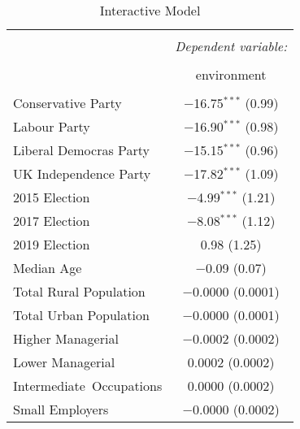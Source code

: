\documentclass[12pt,letterpaper]{article}
\renewcommand{\headrulewidth}{0pt} %
\begin{document}
\newpage

\fancypagestyle{special}{%
	\fancyhf{} %
	\renewcommand{\headrulewidth}{0pt} %
	\renewcommand{\footrulewidth}{0pt} %
	\fancyfoot[R]{\thepage} %
}

\thispagestyle{special}






\begin{table}[H] \centering 
	\caption{Interactive Model} 
	\label{tab:interactive} 
	\footnotesize 
	\begin{tabular}{@{\extracolsep{5pt}}lc} 
		\\[-1.8ex]\hline 
		\hline \\[-1.8ex] 
		& \multicolumn{1}{c}{\textit{Dependent variable:}} \\ 
		\cline{2-2} 
		\\[-1.8ex] & environment \\ 
		\hline \\[-1.8ex] 
		Conservative Party & $-$16.75$^{***}$ (0.99) \\ 
		Labour Party & $-$16.90$^{***}$ (0.98) \\ 
		Liberal Democras Party & $-$15.15$^{***}$ (0.96) \\ 
		UK Independence Party & $-$17.82$^{***}$ (1.09) \\ 
		2015 Election & $-$4.99$^{***}$ (1.21) \\ 
		2017 Election& $-$8.08$^{***}$ (1.12) \\ 
		2019 Election& 0.98 (1.25) \\ 
		Median Age & $-$0.09 (0.07) \\ 
		Total Rural Population & $-$0.0000 (0.0001) \\ 
		Total Urban Population & $-$0.0000 (0.0001) \\ 
		Higher Managerial & $-$0.0002 (0.0002) \\ 
		Lower Managerial & 0.0002 (0.0002) \\ 
		Intermediate\ Occupations & 0.0000 (0.0002) \\ 
		Small Employers & $-$0.0000 (0.0002) \\ 

\end{tabular}
\end{table}
\end{document}
